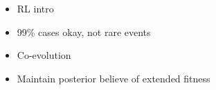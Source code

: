 
\begin{itemize}
  \item{RL intro}
  \item{99\% cases okay, not rare events}
  \item{Co-evolution}
  \item{Maintain posterior believe of extended fitness}
\end{itemize}
